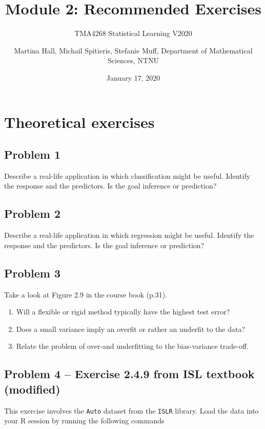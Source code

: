 \documentclass[]{article}
\title{Module 2: Recommended Exercises}
\subtitle{TMA4268 Statistical Learning V2020}
\author{Martina Hall, Michail Spitieris, Stefanie Muff, Department of
Mathematical Sciences, NTNU}
\date{January 17, 2020}
\providecommand{\tightlist}{%
  \setlength{\itemsep}{0pt}\setlength{\parskip}{0pt}}
\begin{document}
\maketitle

\section{Theoretical exercises}\label{theoretical-exercises}

\subsection{Problem 1}\label{problem-1}

Describe a real-life application in which classification might be
useful. Identify the response and the predictors. Is the goal inference
or prediction?

\subsection{Problem 2}\label{problem-2}

Describe a real-life application in which regression might be useful.
Identify the response and the predictors. Is the goal inference or
prediction?

\subsection{Problem 3}\label{problem-3}

Take a look at Figure 2.9 in the course book (p.31).

\begin{enumerate}
\def\labelenumi{\alph{enumi})}
\tightlist
\item
  Will a flexible or rigid method typically have the highest test error?
\item
  Does a small variance imply an overfit or rather an underfit to the
  data?
\item
  Relate the problem of over-and underfitting to the bias-variance
  trade-off.
\end{enumerate}

\subsection{Problem 4 -- Exercise 2.4.9 from ISL textbook
(modified)}\label{problem-4-exercise-2.4.9-from-isl-textbook-modified}

This exercise involves the \texttt{Auto} dataset from the \texttt{ISLR}
library. Load the data into your R session by running the following
commands
\end{document}
